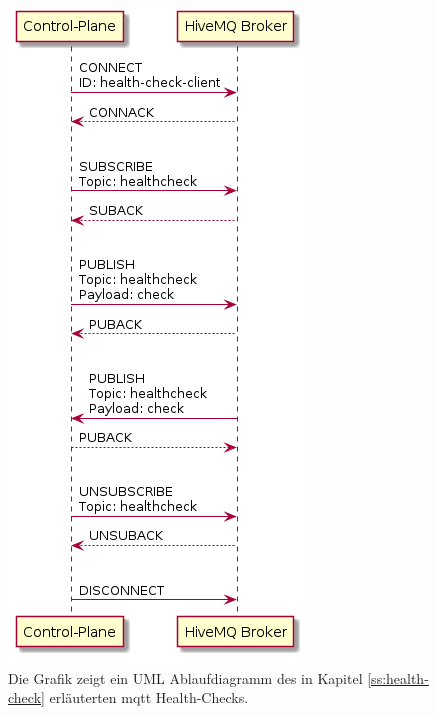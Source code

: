 \begin{figure}
    \centering
    \includegraphics[scale=0.6]{gen/health-check.png}
    \caption{Die Grafik zeigt ein UML Ablaufdiagramm des in Kapitel \ref{ss:health-check} erläuterten \ac{mqtt} Health-Checks.}
    \label{fig:health-check-sequence}
\end{figure}

\newpage
